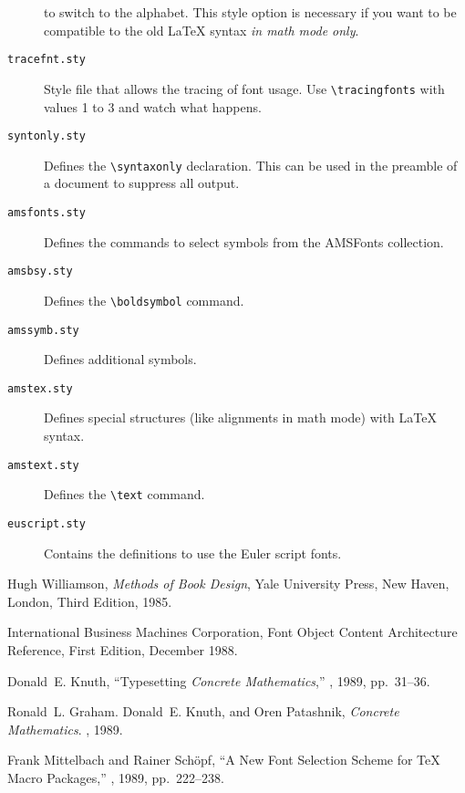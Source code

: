 \begin{description}
    to switch to the
   alphabet.  This style option is necessary if you want to be
   compatible to the old \LaTeX{} syntax {\em in math mode only}.
  \item[\tt tracefnt.sty]
   Style file that allows the tracing of font usage.
   Use \verb=\tracingfonts= with values 1 to 3 and watch
   what happens.
  \item[\tt syntonly.sty]
   Defines the \verb+\syntaxonly+ declaration.  This can be used
   in the preamble of a document to suppress all output.
  \item[\tt amsfonts.sty]
   Defines the commands to select symbols from the AMSFonts
   collection.
  \item[\tt amsbsy.sty]
   Defines the \verb+\boldsymbol+ command.
  \item[\tt amssymb.sty]
   Defines additional \AmSTeX{} symbols.
  \item[\tt amstex.sty]
   Defines special \AmSTeX{} structures (like alignments in math mode)
   with \LaTeX{} syntax.
  \item[\tt amstext.sty]
   Defines the \AmSTeX{} \verb+\text+ command.
  \item[\tt euscript.sty]
   Contains the definitions to use the Euler script fonts.
 \end{description}

 \begin{thebibliography}{9}
 \raggedright
  Hugh Williamson,
      {\sl Methods of Book Design},\newblock
      Yale University Press,
      New Haven, London,\newblock
      Third Edition, 1985.

  International Business Machines Corporation,\newblock
      Font Object Content Architecture Reference,\newblock
      First Edition, December 1988.

  Donald~E. Knuth, ``Typesetting {\sl Concrete
      Mathematics},'' , 1989, pp.~31--36.

  Ronald~L. Graham. Donald~E. Knuth, and
      Oren Patashnik, {\sl Concrete Mathematics}.  \AW, 1989.

  Frank Mittelbach and Rainer Sch\"opf,
      ``A New Font Selection Scheme for \TeX{} Macro Packages,''
      , 1989, pp.~222--238.

 \end{thebibliography}

